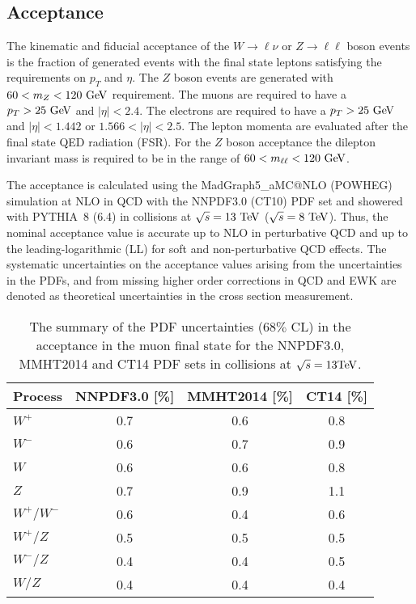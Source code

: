 \subsection{Acceptance}

The kinematic and fiducial acceptance of the $W \rightarrow{\ell\nu}$ or $Z\rightarrow\ell\ell$ boson events is the fraction of generated events with the final state leptons satisfying the requirements on $p_{T}$ and $\eta$. The $Z$ boson events are generated with $60<m_{Z}<120~\mathrm{Ge\kern -0.1em V}$ requirement. The muons are required to have a $p_{T}>25~\mathrm{Ge\kern -0.1em V}$ and $|\eta|<2.4$. The electrons are required to have a $p_{T}>25~\mathrm{Ge\kern -0.1em V}$ and $|\eta|<1.442$ or $1.566<|\eta|<2.5$. The lepton momenta are evaluated after the final state QED radiation (FSR). For the $Z$ boson acceptance the dilepton invariant mass is required to be in the range of $60<m_{\ell\ell}<120~\mathrm{Ge\kern -0.1em V}$.

The acceptance is calculated using the MadGraph5\_aMC@NLO (POWHEG) simulation at NLO in QCD with the NNPDF3.0 (CT10) PDF set and showered with PYTHIA~8 (6.4) in collisions at $\sqrt{s}=13~\mathrm{Te\kern -0.1em V}$ ($\sqrt{s}=8~\mathrm{Te\kern -0.1em V}$). Thus, the nominal acceptance value is accurate up to NLO in perturbative QCD and up to the leading-logarithmic (LL) for soft and non-perturbative QCD effects. The systematic uncertainties on the acceptance values arising from the uncertainties in the PDFs, and from missing higher order corrections in QCD and EWK are denoted as theoretical uncertainties in the cross section measurement. 
\begin{table}
\begin{center}
\begin{tabular}{|l|c|c|c|}
\hline
Process  &  NNPDF3.0 [\%]  &  MMHT2014 [\%]  &  CT14 [\%] \\
\hline
\hline
$W^+$        & 0.7          &  0.6           &  0.8 \\
$W^-$  & 0.6          &  0.7           &  0.9 \\
$W$            & 0.6          &  0.6           &  0.8 \\
$Z$            & 0.7          &  0.9           &  1.1 \\
$W^+/W^-$                        & 0.6          &  0.4           &  0.6 \\
$W^+/Z$                           & 0.5          &  0.5           &  0.5 \\
$W^-/Z$                           & 0.4          &  0.4           &  0.5 \\
$W/Z$                            & 0.4          &  0.4           &  0.4 \\
\hline
\hline
\end{tabular}
\caption{The summary of the PDF uncertainties ($68\%$ CL) in the acceptance in the muon final state for the NNPDF3.0, MMHT2014 and CT14 PDF sets in collisions at $\sqrt{s}=13\mathrm{Te\kern -0.1em V}$.}
\label{tab:pdf_mu}
\end{center}
\end{table}

